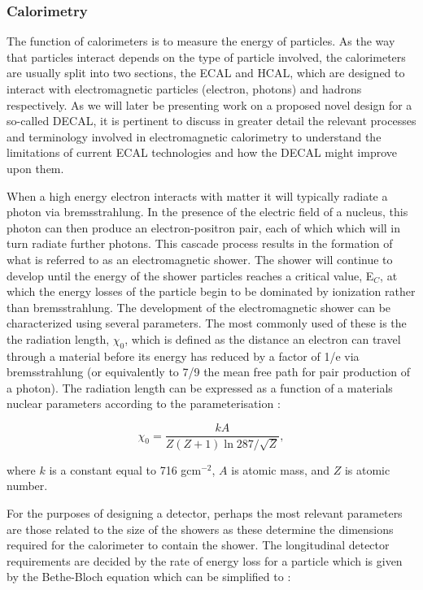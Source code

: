 \subsubsection{Calorimetry}
\label{det:ecal}
The function of calorimeters is to measure the energy of particles. As the way that particles interact depends on the type of particle involved, the calorimeters are usually split into two sections, the \ac{ECAL} and \ac{HCAL}, which are designed to interact with electromagnetic particles (electron, photons) and hadrons respectively. As we will later be presenting work on a proposed novel design for a so-called \ac{DECAL}, it is pertinent to discuss in greater detail the relevant processes and terminology involved in electromagnetic calorimetry to understand the limitations of current \ac{ECAL} technologies and how the \ac{DECAL} might improve upon them.

When a high energy electron interacts with matter it will typically radiate a photon via bremsstrahlung. In the presence of the electric field of a nucleus, this photon can then produce an electron-positron pair, each of which which will in turn radiate further photons. This cascade process results in the formation of what is referred to as an electromagnetic shower. The shower will continue to develop until the energy of the shower particles reaches a critical value, E$_{C}$, at which the energy losses of the particle begin to be dominated by ionization rather than bremsstrahlung. The development of the electromagnetic shower can be characterized using several parameters. The most commonly used of these is the the radiation length, $\chi_0$, which is defined as the distance an electron can travel through a material before its energy has reduced by a factor of 1/e via bremsstrahlung (or equivalently to 7/9 the mean free path for pair production of a photon). The radiation length can be expressed as a function of a materials nuclear parameters according to the parameterisation \cite{Patrignani:2016xqp}:

\begin{equation}
  \chi_0= \frac{kA}{Z(Z+1)\ln{287/\sqrt{Z}}},
\end{equation}

where $k$ is a constant equal to 716 gcm$^{-2}$, $A$ is atomic mass, and $Z$ is atomic number.

For the purposes of designing a detector, perhaps the most relevant parameters are those related to the size of the showers as these determine the dimensions required for the calorimeter to contain the shower. The longitudinal detector requirements are decided by the rate of energy loss for a particle which is given by the Bethe-Bloch equation which can be simplified to \cite{Patrignani:2016xqp}:

